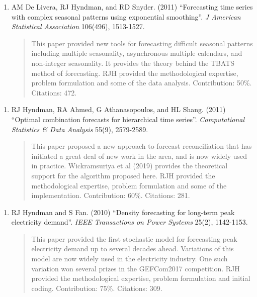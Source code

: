 \documentclass[10pt,a4paper,]{article}
\providecommand{\tightlist}{%
  \setlength{\itemsep}{0pt}\setlength{\parskip}{0pt}}
\begin{document}
\begin{enumerate}
\def\labelenumi{\arabic{enumi}.}
\setcounter{enumi}{2}
\tightlist
\item
  AM De Livera, RJ Hyndman, and RD Snyder. (2011) ``Forecasting time
  series with complex seasonal patterns using exponential smoothing''. \emph{J
  American Statistical Association} 106(496), 1513-1527.

  \begin{quote}     This paper provided new tools for forecasting difficult seasonal patterns including multiple seasonality, asynchronous multiple calendars, and non-integer seasonality. It provides the theory behind the TBATS method of forecasting. RJH provided the methodological expertise, problem formulation and some of the data analysis. Contribution: 50\%.  Citations: 472.\end{quote}
\end{enumerate}

\vspace*{0.2cm}

\begin{enumerate}
\def\labelenumi{\arabic{enumi}.}
\setcounter{enumi}{3}
\tightlist
\item
  RJ Hyndman, RA Ahmed, G Athanasopoulos, and HL Shang. (2011) ``Optimal
  combination forecasts for hierarchical time series''. \emph{Computational
  Statistics \& Data Analysis} 55(9), 2579-2589.

  \begin{quote}     This paper proposed a new approach to forecast reconciliation that has initiated a great deal of new work in the area, and is now widely used in practice. Wickramsuriya et al (2019) provides the theoretical support for the algorithm proposed here. RJH provided the methodological expertise, problem formulation and some of the implementation. Contribution: 60\%.  Citations: 281.\end{quote}
\end{enumerate}

\vspace*{0.2cm}

\begin{enumerate}
\def\labelenumi{\arabic{enumi}.}
\setcounter{enumi}{4}
\tightlist
\item
  RJ Hyndman and S Fan. (2010) ``Density forecasting for long-term peak
  electricity demand''. \emph{IEEE Transactions on Power Systems} 25(2),
  1142-1153.

  \begin{quote}     This paper provided the first stochastic model for forecasting peak electricity demand up to several decades ahead. Variations of this model are now widely used in the electricity industry. One such variation won several prizes in the GEFCom2017 competition. RJH provided the methodological expertise, problem formulation and initial coding. Contribution: 75\%.  Citations: 309.\end{quote}
\end{enumerate}
\end{document}
